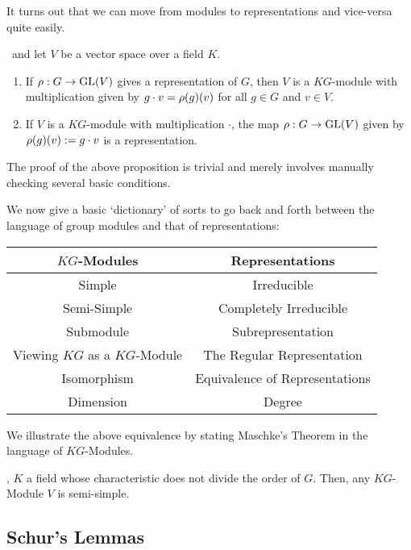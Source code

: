 It turns out that we can move from modules to representations and vice-versa quite easily.

\begin{proposition}
    \ and let $V$ be a vector space over a field $K$.
    \begin{enumerate}[label = \normalfont \arabic*.]
        \item If $\rho : G \to \operatorname{GL}\!\left( V \right)$ gives a representation of $G$, then $V$ is a $KG$-module with multiplication given by $g \cdot v = \rho\!\left( g \right)\!\left( v \right)$ for all $g \in G$ and $v \in V$.
        \item If $V$ is a $KG$-module with multiplication $\cdot$, the map $\rho : G \to \operatorname{GL}\!\left( V \right)$ given by $\rho\!\left( g \right)\!\left( v \right) := g \cdot v$ is a representation.
    \end{enumerate}
\end{proposition}

The proof of the above proposition is trivial and merely involves manually checking several basic conditions.

We now give a basic `dictionary' of sorts to go back and forth between the language of group modules and that of representations:

\begin{table}[!h]
    \centering
    \begin{tabular}{c|c}
        \textbf{$KG$-Modules} & \textbf{Representations} \\ \hline
        Simple & Irreducible \\
        Semi-Simple & Completely Irreducible \\
        Submodule & Subrepresentation \\
        Viewing $KG$ as a $KG$-Module & The Regular Representation \\
        Isomorphism & Equivalence of Representations \\
        Dimension & Degree
    \end{tabular}
\end{table}

We illustrate the above equivalence by stating Maschke's Theorem in the language of $KG$-Modules.

\begin{lemma}
    , $K$ a field whose characteristic does not divide the order of $G$. Then, any $KG$-Module $V$ is semi-simple.
\end{lemma}

\subsection{Schur's Lemmas}

